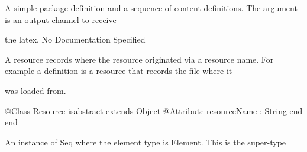         A simple package definition and a sequence of content 
        definitions. The argument is an output channel to receive

        the latex.
No Documentation Specified

      A resource records where the resource originated via a resource name.
      For example a definition is a resource that records the file where it

      was loaded from.
\begin{Interface}
@Class Resource isabstract extends Object
  @Attribute resourceName : String end
end
\end{Interface}

      An instance of Seq where the element type is Element. This is the super-type

